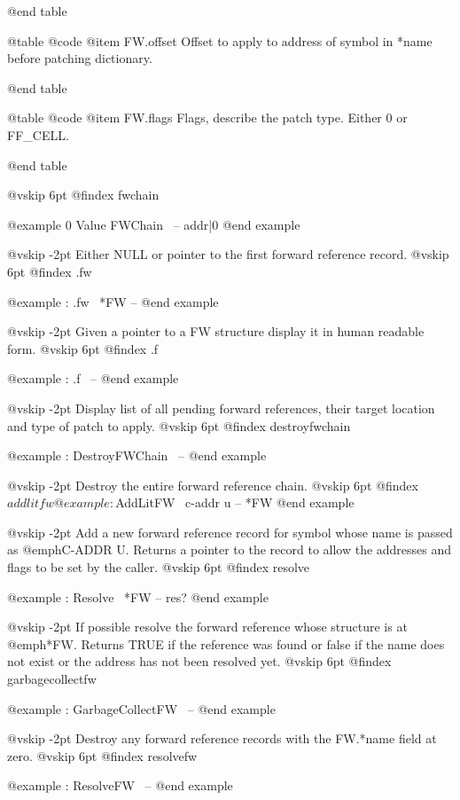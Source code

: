 @end table



@table @code
@item FW.offset
Offset to apply to address of symbol in *name before
 patching dictionary.

@end table



@table @code
@item FW.flags
Flags, describe the patch type. Either 0 or FF_CELL.

@end table

@vskip 6pt
@findex fwchain

@example
0 Value FWChain \ -- addr|0 @end example

@vskip -2pt
Either NULL or pointer to the first forward reference record.
@vskip 6pt
@findex .fw

@example
: .fw                   \ *FW -- @end example

@vskip -2pt
Given a pointer to a FW structure display it in human readable
form.
@vskip 6pt
@findex .f

@example
: .f                    \ -- @end example

@vskip -2pt
Display list of all pending forward references, their target
location and type of patch to apply.
@vskip 6pt
@findex destroyfwchain

@example
: DestroyFWChain        \ -- @end example

@vskip -2pt
Destroy the entire forward reference chain.
@vskip 6pt
@findex $addlitfw

@example
: $AddLitFW             \ c-addr u -- *FW @end example

@vskip -2pt
Add a new forward reference record for symbol whose name is
passed as @emph{C-ADDR U}. Returns a pointer to the record to
allow the addresses and flags to be set by the caller.
@vskip 6pt
@findex resolve

@example
: Resolve               \ *FW -- res? @end example

@vskip -2pt
If possible resolve the forward reference whose structure is at
@emph{*FW}. Returns TRUE if the reference was found or false if the
name does not exist or the address has not been resolved yet.
@vskip 6pt
@findex garbagecollectfw

@example
: GarbageCollectFW      \ -- @end example

@vskip -2pt
Destroy any forward reference records with the FW.*name field
at zero.
@vskip 6pt
@findex resolvefw

@example
: ResolveFW             \ -- @end example

